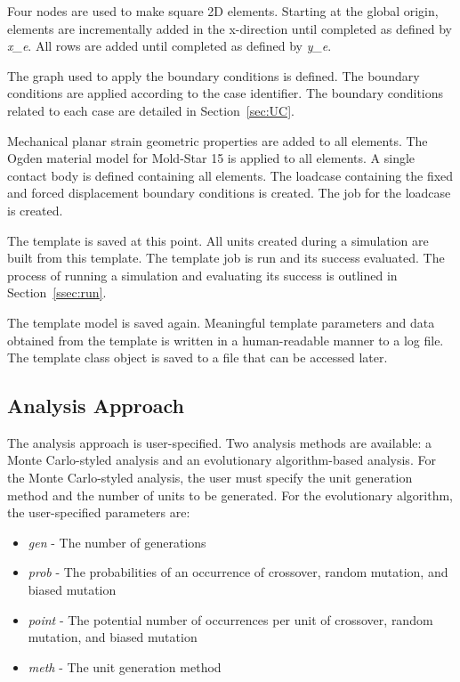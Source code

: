 Four nodes are used to make square 2D elements. Starting at the global origin, elements are incrementally added in the x-direction until completed as defined by \textit{x\_e}. All rows are added until completed as defined by \textit{y\_e}.

The graph used to apply the boundary conditions is defined. The boundary conditions are applied according to the case identifier. The boundary conditions related to each case are detailed in Section~\ref{sec:UC}.

Mechanical planar strain geometric properties are added to all elements. The Ogden material model for Mold-Star 15 is applied to all elements. A single contact body is defined containing all elements. The loadcase containing the fixed and forced displacement boundary conditions is created. The job for the loadcase is created.

The template is saved at this point. All units created during a simulation are built from this template. The template job is run and its success evaluated. The process of running a simulation and evaluating its success is outlined in Section~\ref{ssec:run}.

The template model is saved again. Meaningful template parameters and data obtained from the template is written in a human-readable manner to a log file. The template class object is saved to a file that can be accessed later.

\subsection{Analysis Approach}

The analysis approach is user-specified. Two analysis methods are available: a Monte Carlo-styled analysis and an evolutionary algorithm-based analysis. For the Monte Carlo-styled analysis, the user must specify the unit generation method and the number of units to be generated. For the evolutionary algorithm, the user-specified parameters are:

\begin{itemize}
	\item \textit{gen} - The number of generations
	\item \textit{prob} - The probabilities of an occurrence of crossover, random mutation, and biased mutation
	\item \textit{point} - The potential number of occurrences per unit of crossover, random mutation, and biased mutation
	\item \textit{meth} - The unit generation method
\end{itemize}

